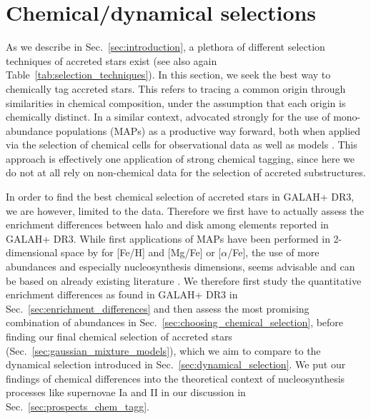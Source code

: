 \documentclass[fleqn,usenatbib]{mnras}
\begin{document}
\section{Chemical/dynamical selections} \label{sec:our_selection_techniques}

As we describe in Sec.~\ref{sec:introduction}, a plethora of different selection techniques of accreted stars exist (see also again Table~\ref{tab:selection_techniques}). In this section, we seek the best way to chemically tag \citep{FreemanBlandHawthorn2002} accreted stars. This refers to tracing a common origin through similarities in chemical composition, under the assumption that each origin is chemically distinct. In a similar context, \citet{Rix2013} advocated strongly for the use of mono-abundance populations (MAPs) as a productive way forward, both when applied via the selection of chemical cells \citep{Lu2021} for observational data \citep[e.g.][]{Bovy2012, Bovy2012b, Bovy2016} as well as models \citep[e.g.][]{Bird2013, Minchev2017}. This approach is effectively one application of strong chemical tagging, since here we do not at all rely on non-chemical data for the selection of accreted substructures. 

In order to find the best chemical selection of accreted stars in GALAH+ DR3, we are however, limited to the data. Therefore we first have to actually assess the enrichment differences between halo and disk among elements reported in GALAH+ DR3. While first applications of MAPs have been performed in 2-dimensional space by \citet{Navarro2011,DiMatteo2019,Carollo2021} for [Fe/H] and [Mg/Fe] or [$\alpha$/Fe], the use of more abundances and especially nucleosynthesis dimensions, seems advisable and can be based on already existing literature \citep{Nissen2010,Nissen2011,Nissen2012, Nissen2014, Hawkins2015, Hayes2018, Das2020}. We therefore first study the quantitative enrichment differences as found in GALAH+ DR3 in Sec.~\ref{sec:enrichment_differences} and then assess the most promising combination of abundances in Sec.~\ref{sec:choosing_chemical_selection}, before finding our final chemical selection of accreted stars (Sec.~\ref{sec:gaussian_mixture_models}), which we aim to compare to the dynamical selection introduced in Sec.~\ref{sec:dynamical_selection}. We put our findings of chemical differences into the theoretical context of nucleosynthesis processes like supernovae Ia and II in our discussion in Sec.~\ref{sec:prospects_chem_tagg}.
\end{document}
